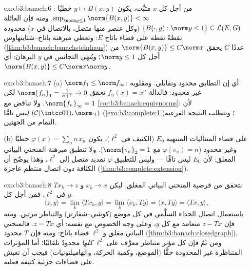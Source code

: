 \begin{solution}{exo:b3:banach:6}
من أجل كل $x$ مثبَّت، يكون $y \mapsto B(x, y)$ خطيًا : $\sup_{\norm y \leq 1}\norm{B(x,y)} < \infty$. ومنه فإن
العائلة
$\{B(\cdot, y) : \norm y \leq 1\} \subseteq \mathcal L(E, G)$
(وكل عنصر منها متصل، بالاتصال في $x$) محدودة نقطةً نقطة على
فضاء باناخ $E$: وتعطي مبرهنة باناخ--شتاينهاوس (\cref{thm:b3:banach:banachsteinhaus})
عددًا $C$ يحقق $\norm{B(x,y)} \leq C\norm x$ من أجل كل $\norm y \leq 1$؛ ويُنهي التجانس
في $y$ البرهانَ: أي $\norm{B(x,y)} \leq
C\norm x\norm y$.
\end{solution}

\begin{solution}{exo:b3:banach:7}
(a) $\norm f_1 \leq \norm f_\infty$: أي إن التطابق محدود وتقابلي. ومقلوبه غير محدود:
فالدالة $f_n(x) = x^n$ تحقق $\norm{f_n}_1 = \frac1{n+1} \to 0$ لكن $\norm{f_n}_\infty = 1$. ولا تناقض مع
\cref{cor:b3:banach:equivnorms}: لأن $(\mathcal
C(\intcc01), \norm\cdot_1)$ \emph{ليس} تامًّا (\cref{exo:b3:complete:1})؛ وتتطلب
النتيجة الفرعية التمام من الجهتين.

(b) على فضاء المتتاليات المنتهية $E_0$ (الكثيف في $\ell^2$)،
يكون $\varphi(x) = \sum_n n\,x_n$ خطيًا وغير محدود ($\varphi(e_n) = n$ مع $\norm{e_n}_2 = 1$). ولا تنطبق
مبرهنة المنحني البياني المغلق: لأن $E_0$ ليس تامًّا --- وليس
للتطبيق $\varphi$ تمديد متصل إلى $\ell^2$، وهذا يوضّح أن الكثافة دون
اتصال منتظم عاجزة (\cref{thm:b3:complete:extension}).
\end{solution}

\begin{solution}{exo:b3:banach:8}
نتحقق من فرضية المنحني البياني المغلق. ليكن $x_k \to x$
و $Tx_k \to z$ في $\ell^2$. فمن أجل كل $y$:
\[
\langle z, y\rangle = \lim_k\langle Tx_k, y\rangle
= \lim_k \langle x_k, Ty\rangle = \langle x, Ty\rangle
= \langle Tx, y\rangle,
\]
باستعمال اتصال الجداء السلَّمي في كل موضع (كوشي--شفارتز)
والتناظر مرتين. ومنه فإن $z - Tx$ متعامد مع كل $y$، وعلى وجه
الخصوص مع نفسه: أي $z = Tx$. فالمنحني البياني مغلق و $\ell^2$
فضاء باناخ: ومنه فإن $T$ محدود (\cref{thm:b3:banach:closedgraph}). ومن ثَمّ فإن كل
مؤثر متناظر معرَّف على $\ell^2$ \emph{كلها} محدودٌ تلقائيًا؛
أما المؤثرات المتناظرة غير المحدودة حقًّا (الموضع، وكمية
الحركة، والهاميلتونيات) فيجب أن تعيش على فضاءات جزئية كثيفة
فعلية.
\end{solution}


